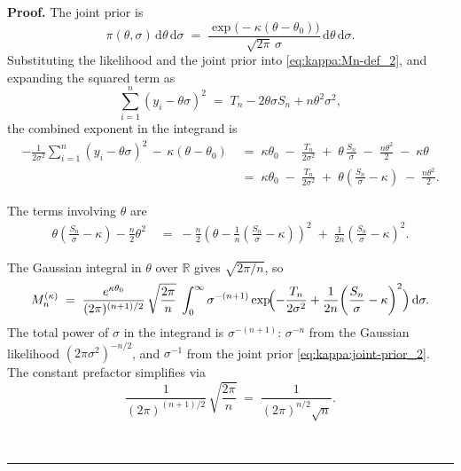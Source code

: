 \documentclass{article}%
\newenvironment{proof}[1][Proof]{\noindent\textbf{#1.} }{\ \rule{0.5em}{0.5em}}
\begin{document}
\begin{proof}
The joint prior is
\begin{equation}
  \pi(\theta, \sigma)\, \mathrm{d}\theta\, \mathrm{d}\sigma
  \;=\;
  \frac{\exp\!\bigl(-\kappa(\theta - \theta_0)\bigr)}{\sqrt{2\pi}\, \sigma}\,
  \mathrm{d}\theta\, \mathrm{d}\sigma.
  \label{eq:kappa:joint-prior_2}
\end{equation}
Substituting the likelihood and the
joint prior into
\eqref{eq:kappa:Mn-def_2}, and expanding the squared term as
\[
  \sum_{i=1}^n (y_i - \theta \sigma)^2
  \;=\; T_n - 2 \theta \sigma S_n + n \theta^2 \sigma^2,
\]
the combined exponent in the integrand is
    \begin{align*}
  -\frac{1}{2\sigma^2} \sum_{i=1}^n (y_i - \theta\sigma)^2
  \,-\, \kappa(\theta - \theta_0)
  &\;=\;
  \kappa \theta_0
  \;-\; \frac{T_n}{2\sigma^2}
  \;+\; \theta\, \frac{S_n}{\sigma}
  \;-\; \frac{n \theta^2}{2}
  \;-\; \kappa \theta \\
  &\;=\;
  \kappa \theta_0
  \;-\; \frac{T_n}{2\sigma^2}
  \;+\; \theta\!\left(\frac{S_n}{\sigma} - \kappa\right)
  \;-\; \frac{n \theta^2}{2}.
\end{align*}

The terms involving $\theta$ are
\begin{align*}
  \theta\!\left(\frac{S_n}{\sigma} - \kappa\right)
  - \frac{n}{2} \theta^2
  &\;=\;
  -\frac{n}{2}\!\left(\theta - \frac{1}{n}\!\left(\frac{S_n}{\sigma}
                                                 - \kappa\right)\!\right)^2
  \;+\; \frac{1}{2n}\!\left(\frac{S_n}{\sigma} - \kappa\right)^2.
\end{align*}

The Gaussian integral in $\theta$ over $\mathbb{R}$ gives
$\sqrt{2\pi/n}$, so
\begin{align}
  M_n^{(\kappa)}
  \;=\;
  \frac{e^{\kappa \theta_0}}{(2\pi)^{(n+1)/2}}\,
  \sqrt{\frac{2\pi}{n}}
  \;\int_0^\infty
  \sigma^{-(n+1)}
  \exp\!\Bigl(
    -\frac{T_n}{2\sigma^2}
    + \frac{1}{2n}\!\left(\frac{S_n}{\sigma} - \kappa\right)^2
  \Bigr)\, \mathrm{d}\sigma.
  \label{eq:kappa:after-theta_2}
\end{align}
The total power of $\sigma$ in the integrand is $\sigma^{-(n+1)}$:
$\sigma^{-n}$ from the Gaussian likelihood
$(2\pi\sigma^2)^{-n/2}$, and $\sigma^{-1}$ from the joint prior
\eqref{eq:kappa:joint-prior_2}.  The constant prefactor simplifies via
\[
  \frac{1}{(2\pi)^{(n+1)/2}}\, \sqrt{\frac{2\pi}{n}}
  \;=\;
  \frac{1}{(2\pi)^{n/2} \sqrt n}.
\]


\end{proof}
\end{document}

